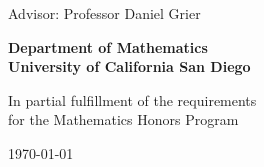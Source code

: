 \begin{titlepage}
\begin{center}
    \Huge
    \textbf{\titletext}

    \vfill

    \LARGE
    \authortext

    \Large
    Advisor: Professor Daniel Grier

    \vspace{1cm}

    \large
    \textbf{Department of Mathematics}\\
    \textbf{University of California San Diego}

    \vfill

    In partial fulfillment of the requirements\\
    for the Mathematics Honors Program
    
    \vspace{1cm}
    \monthyeardate\today
\end{center}
\end{titlepage}